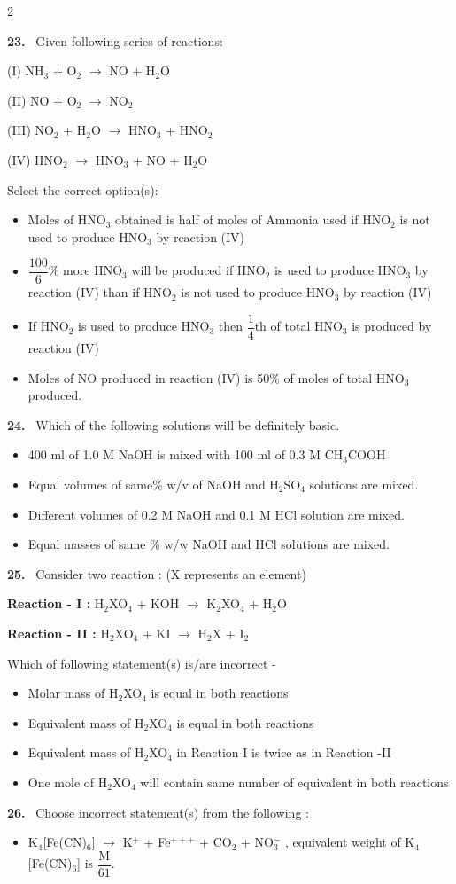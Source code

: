 \documentclass[10pt]{extarticle}
\newcommand{\qn}[1]{\par\smallskip\noindent\textbf{#1.}~}
\newenvironment{qoptions}{\begin{itemize}[leftmargin=1.8em,itemsep=1pt,topsep=2pt,label={}]}{\end{itemize}}
\newcommand{\opt}[2]{\item[(#1)] #2}
\begin{document}
\begin{multicols}{2}
\qn{23} Given following series of reactions:\par
(I) NH$_3$ + O$_2$ $\longrightarrow$ NO + H$_2$O\par
(II) NO + O$_2$ $\longrightarrow$ NO$_2$\par
(III) NO$_2$ + H$_2$O $\longrightarrow$ HNO$_3$ + HNO$_2$\par
(IV) HNO$_2$ $\longrightarrow$ HNO$_3$ + NO + H$_2$O\par
Select the correct option(s):
\begin{qoptions}
\opt{A}{Moles of HNO$_3$ obtained is half of moles of Ammonia used if HNO$_2$ is not used to produce HNO$_3$ by reaction (IV)}
\opt{B}{$\dfrac{100}6$\% more HNO$_3$ will be produced if HNO$_2$ is used to produce HNO$_3$ by reaction (IV) than if HNO$_2$ is not used to produce HNO$_3$ by reaction (IV)}
\opt{C}{If HNO$_2$ is used to produce HNO$_3$ then $\dfrac14$th of total HNO$_3$ is produced by reaction (IV)}
\opt{D}{Moles of NO produced in reaction (IV) is 50\% of moles of total HNO$_3$ produced.}
\end{qoptions}
\qn{24} Which of the following solutions will be definitely basic.
\begin{qoptions}
\opt{A}{400 ml of 1.0 M NaOH is mixed with 100 ml of 0.3 M CH$_3$COOH}
\opt{B}{Equal volumes of same\% w/v of NaOH and H$_2$SO$_4$ solutions are mixed.}
\opt{C}{Different volumes of 0.2 M NaOH and 0.1 M HCl solution are mixed.}
\opt{D}{Equal masses of same \% w/w NaOH and HCl solutions are mixed.}
\end{qoptions}
\qn{25} Consider two reaction : (X represents an element)\par
\textbf{Reaction - I :} \quad H$_2$XO$_4$ + KOH $\to$ K$_2$XO$_4$ + H$_2$O\par
\textbf{Reaction - II :} \quad H$_2$XO$_4$ + KI $\to$ H$_2$X + I$_2$\par
Which of following statement(s) is/are incorrect -
\begin{qoptions}
\opt{A}{Molar mass of H$_2$XO$_4$ is equal in both reactions}
\opt{B}{Equivalent mass of H$_2$XO$_4$ is equal in both reactions}
\opt{C}{Equivalent mass of H$_2$XO$_4$ in Reaction I is twice as in Reaction -II}
\opt{D}{One mole of H$_2$XO$_4$ will contain same number of equivalent in both reactions}
\end{qoptions}
\qn{26} Choose incorrect statement(s) from the following :
\begin{qoptions}
\opt{A}{K$_4$[Fe(CN)$_6$] $\longrightarrow$ K$^+$ + Fe$^{+++}$ + CO$_2$ + NO$_3^-$ , equivalent weight of K$_4$[Fe(CN)$_6$] is $\dfrac{\mathrm M}{61}$.}

\end{qoptions}
\end{multicols}
\end{document}
